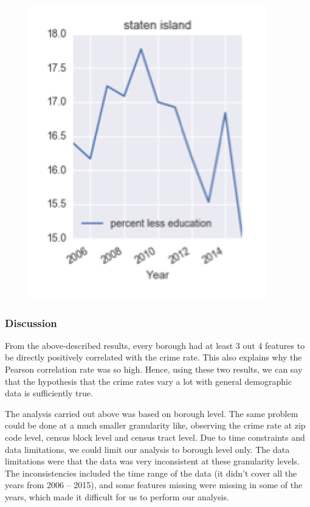 \documentclass{article}
\begin{document}
\begin{itemize}
\begin{enumerate}[label=(\alph*)]
\begin{figure}[H]
\centering
\includegraphics[scale=1]{SIEduc.png}
\end{figure}
\end{enumerate}
\end{itemize}

\subsubsection{Discussion}

From the above-described results, every borough had at least 3 out 4 features to be directly positively correlated with the crime rate. This also explains why the Pearson correlation rate was so high. Hence, using these two results, we can say that the hypothesis that the crime rates vary a lot with general demographic data is sufficiently true. 

The analysis carried out above was based on borough level. The same problem could be done at a much smaller granularity like, observing the crime rate at zip code level, census block level and census tract level. Due to time constraints and data limitations, we could limit our analysis to borough level only. The data limitations were that the data was very inconsistent at these granularity levels. The inconsistencies included the time range of the data (it didn’t cover all the years from 2006 – 2015), and some features missing were missing in some of the years, which made it difficult for us to perform our analysis.
\end{document}
